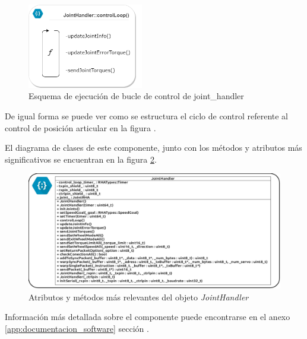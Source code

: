         \begin{figure}[H]
            \centering
            \includegraphics[width=0.45\textwidth]{figuras/Imagenes_SW/joint_handler_loop.png}
            \caption{Esquema de ejecución de bucle de control de joint\_handler}
            \label{fig:SW:joint_handler_loop}
        \end{figure}

        De igual forma se puede ver como se estructura el ciclo de control referente al control de posición articular en la figura \completar.

        El diagrama de clases de este componente, junto con los métodos y atributos más significativos se encuentran en la figura \ref{fig:SW:class_diagram_JH}.

        \begin{figure}[H]
            \centering
            \includegraphics[width=1\textwidth]{figuras/Imagenes_SW/class_diagram_JH.jpg}
            \caption{Atributos y métodos más relevantes del objeto \textit{JointHandler}}
            \label{fig:SW:class_diagram_JH}
        \end{figure}

        Información más detallada sobre el componente puede encontrarse en el anexo \ref{app:documentacion_software} sección \completar.
